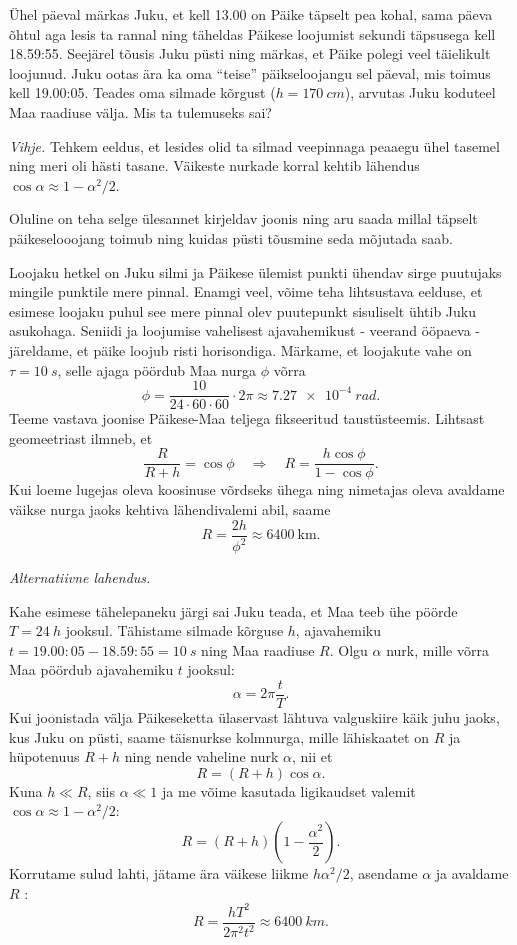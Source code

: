 
Ühel päeval märkas Juku, et kell 13.00 on Päike täpselt pea kohal, sama päeva õhtul aga lesis ta rannal ning täheldas Päikese loojumist sekundi täpsusega kell 18.59:55. Seejärel tõusis Juku püsti ning märkas, et Päike polegi veel täielikult loojunud. Juku ootas ära ka oma \enquote{teise} päikseloojangu sel päeval, mis toimus kell 19.00:05. Teades oma silmade kõrgust ($h = \SI{170}{cm}$), arvutas Juku koduteel Maa raadiuse välja. Mis ta tulemuseks sai?

\emph{Vihje.} Tehkem eeldus, et lesides olid ta silmad veepinnaga peaaegu ühel tasemel ning meri oli hästi tasane. Väikeste nurkade korral kehtib lähendus $\cos \alpha \approx 1 - \alpha^2/2$.

\hint
Oluline on teha selge ülesannet kirjeldav joonis ning aru saada millal täpselt päikeselooojang toimub ning kuidas püsti tõusmine seda mõjutada saab.

\solu
Loojaku hetkel on Juku silmi ja Päikese ülemist punkti ühendav sirge puutujaks mingile punktile mere pinnal. Enamgi veel, võime teha lihtsustava eelduse, et esimese loojaku puhul see mere pinnal olev puutepunkt sisuliselt ühtib Juku asukohaga. Seniidi ja loojumise vahelisest ajavahemikust - veerand ööpaeva - järeldame, et päike loojub risti horisondiga. Märkame, et loojakute vahe on $\tau=\SI{10}{s}$, selle ajaga pöördub Maa nurga $\phi$ võrra
$$
\phi=\frac{10}{24 \cdot 60 \cdot 60} \cdot 2 \pi \approx \SI{7.27e-4}{rad}.
$$
Teeme vastava joonise Päikese-Maa teljega fikseeritud taustüsteemis. Lihtsast geomeetriast ilmneb, et
$$
\frac{R}{R+h}=\cos \phi \quad \Rightarrow \quad R=\frac{h \cos \phi}{1-\cos \phi} .
$$
Kui loeme lugejas oleva koosinuse võrdseks ühega ning nimetajas oleva avaldame väikse nurga jaoks kehtiva lähendivalemi abil, saame
$$
R=\frac{2 h}{\phi^{2}} \approx 6400 \mathrm{~km} .
$$

\emph{Alternatiivne lahendus.}

Kahe esimese tähelepaneku järgi sai Juku teada, et Maa teeb ühe pöörde $T=\SI{24}{h}$ jooksul. Tähistame silmade kõrguse $h$, ajavahemiku $t=19.00: 05-18.59: 55=\SI{10}{s}$ ning Maa raadiuse $R$. Olgu $\alpha$ nurk, mille võrra Maa pöördub ajavahemiku $t$ jooksul:
$$
\alpha=2 \pi \frac{t}{T}.
$$
Kui joonistada välja Päikeseketta ülaservast lähtuva valguskiire käik juhu jaoks, kus Juku on püsti, saame täisnurkse kolmnurga, mille lähiskaatet on $R$ ja hüpotenuus $R+h$ ning nende vaheline nurk $\alpha$, nii et
$$
R=(R+h) \cos \alpha.
$$
Kuna $h \ll R$, siis $\alpha \ll 1$ ja me võime kasutada ligikaudset valemit $\cos \alpha \approx 1-\alpha^{2}/2$:
$$
R=(R+h)\left(1-\frac{\alpha^{2}}{2}\right).
$$
Korrutame sulud lahti, jätame ära väikese liikme $h \alpha^{2} / 2$, asendame $\alpha$ ja avaldame $R$ :
$$
R=\frac{h T^{2}}{2 \pi^{2} t^{2}} \approx \SI{6400}{km}.
$$

\probend